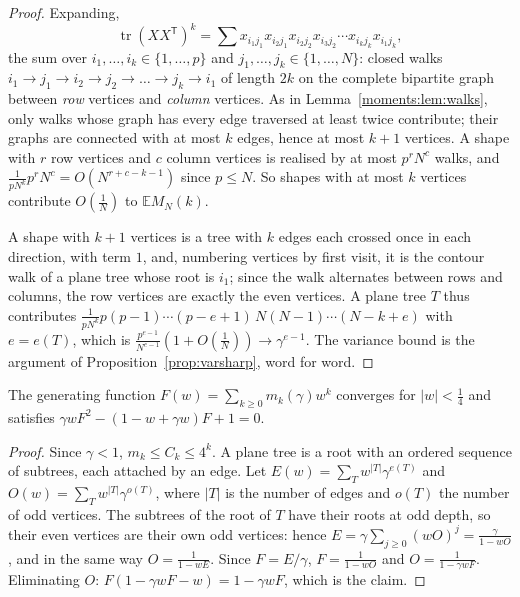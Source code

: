 \begin{proof}
Expanding,
\[
\operatorname{tr}(XX^{\mathsf T})^k=\sum x_{i_1j_1}x_{i_2j_1}x_{i_2j_2}x_{i_3j_2}\cdots x_{i_kj_k}x_{i_1j_k},
\]
the sum over $i_1,\dots,i_k\in\{1,\dots,p\}$ and $j_1,\dots,j_k\in\{1,\dots,N\}$: closed walks $i_1\to j_1\to i_2\to j_2\to\dots\to j_k\to i_1$ of length $2k$ on the complete bipartite graph between \emph{row} vertices and \emph{column}
vertices. As in Lemma~\ref{moments:lem:walks}, only walks whose graph has every edge traversed at least twice contribute; their graphs are connected with at most $k$ edges, hence at most $k+1$ vertices. A shape with $r$ row
vertices and $c$ column vertices is realised by at most $p^rN^c$ walks, and $\frac1{pN^k}p^rN^c=O(N^{r+c-k-1})$ since $p\le N$. So shapes with at most $k$ vertices contribute $O(\frac1N)$ to $\mathbb EM_N(k)$.

A shape with $k+1$ vertices is a tree with $k$ edges each crossed once in each direction, with term $1$, and, numbering vertices by first visit, it is the contour walk of a plane tree whose root is $i_1$; since the walk
alternates between rows and columns, the row vertices are exactly the even vertices. A plane tree $T$ thus contributes $\frac{1}{pN^k}p(p-1)\cdots(p-e+1)\,N(N-1)\cdots(N-k+e)$ with $e=e(T)$, which is
$\frac{p^{e-1}}{N^{e-1}}(1+O(\frac1N))\to\gamma^{e-1}$. The variance bound is the argument of Proposition~\ref{prop:varsharp}, word for word.
\end{proof}

\begin{lemma}\label{lem:mpgf}
The generating function $F(w)=\sum_{k\ge0}m_k(\gamma)w^k$ converges for $|w|<\frac14$ and satisfies $\gamma wF^2-(1-w+\gamma w)F+1=0$.
\end{lemma}

\begin{proof}
Since $\gamma<1$, $m_k\le C_k\le4^k$. A plane tree is a root with an ordered sequence of subtrees, each attached by an edge. Let $E(w)=\sum_Tw^{|T|}\gamma^{e(T)}$ and $O(w)=\sum_Tw^{|T|}\gamma^{o(T)}$, where $|T|$ is the number of edges and
$o(T)$ the number of odd vertices. The subtrees of the root of $T$ have their roots at odd depth, so their even vertices are their own odd vertices: hence $E=\gamma\sum_{j\ge0}(wO)^j=\frac\gamma{1-wO}$, and in the same way
$O=\frac1{1-wE}$. Since $F=E/\gamma$, $F=\frac1{1-wO}$ and $O=\frac1{1-\gamma wF}$. Eliminating $O$: $F(1-\gamma wF-w)=1-\gamma wF$, which is the claim.
\end{proof}

